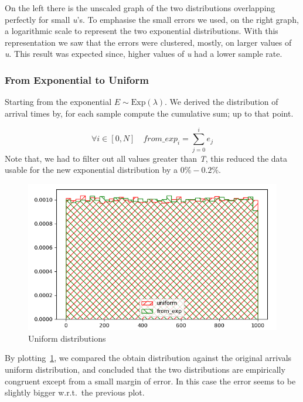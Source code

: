 \documentclass[10pt,a4paper]{article}
\begin{document}
On the left there is the unscaled graph of the two distributions overlapping perfectly for small \emph{u}'s. To emphasise the small errors we used, on the right graph, a logarithmic scale to represent the two exponential distributions. With this representation we saw that the errors were clustered, mostly, on larger values of \emph{u}. This result was expected since, higher values of \emph{u} had a lower sample rate.

\subsubsection*{From Exponential to Uniform}

Starting from the exponential \(E\sim\text{Exp}(\lambda)\). We derived the distribution of arrival times by, for each sample compute the cumulative sum; up to that point.

\begin{equation*}
  \forall i\in[0,N]\quad from\_exp_{i} =\sum_{j=0}^{i}{e_{j}}
\end{equation*}
Note that, we had to filter out all values greater than \emph{T}, this reduced the data usable for the new exponential distribution by a \(0\%-0.2\%\). %

\begin{figure}[h]
  \centering
  \includegraphics[scale=0.35]{es1-2.png}
  \caption{Uniform distributions}
  \label{fig:2}
\end{figure}

By plotting~\ref{fig:2}, we compared the obtain distribution against the original arrivals uniform distribution, and concluded that the two distributions are empirically congruent except from a small margin of error. In this case the error seems to be slightly bigger w.r.t.\ the previous plot.
\end{document}
